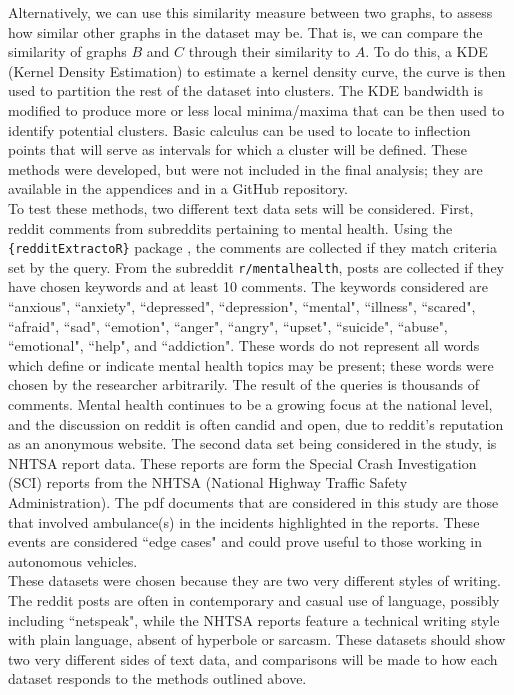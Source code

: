 Alternatively, we can use this similarity measure between two graphs, to assess how similar other graphs in the dataset may be. That is, we can compare the similarity of graphs $B$ and $C$ through their similarity to $A$. To do this, a KDE (Kernel Density Estimation) to estimate a kernel density curve, the curve is then used to partition the rest of the dataset into clusters. The KDE bandwidth is modified to produce more or less local minima/maxima that can be then used to identify potential clusters. Basic calculus can be used to locate to inflection points that will serve as intervals for which a cluster will be defined. These methods were developed, but were not included in the final analysis; they are available in the appendices and in a GitHub repository. \\

To test these methods, two different text data sets will be considered. First, reddit comments from subreddits pertaining to mental health. Using the \texttt{\{redditExtractoR\}} package \cite{rivera2015package}, the comments are collected if they match criteria set by the query. From the subreddit \texttt{r/mentalhealth}, posts are collected if they have chosen keywords and at least 10 comments. The keywords considered are ``anxious", ``anxiety", ``depressed", ``depression", ``mental", ``illness", ``scared", ``afraid", ``sad", ``emotion", ``anger", ``angry", ``upset", ``suicide", ``abuse", ``emotional", ``help", and ``addiction". These words do not represent all words which define or indicate mental health topics may be present; these words were chosen by the researcher arbitrarily. The result of the queries is thousands of comments. Mental health continues to be a growing focus at the national level, and the discussion on reddit is often candid and open, due to reddit's reputation as an anonymous website. The second data set being considered in the study, is NHTSA report data. These reports are form the Special Crash Investigation (SCI) reports from the NHTSA (National Highway Traffic Safety Administration). The pdf documents that are considered in this study are those that involved ambulance(s) in the incidents highlighted in the reports. These events are considered ``edge cases" and could prove useful to those working in autonomous vehicles. \\

These datasets were chosen because they are two very different styles of writing. The reddit posts are often in contemporary and casual use of language, possibly including ``netspeak", while the NHTSA reports feature a technical writing style with plain language, absent of hyperbole or sarcasm. These datasets should show two very different sides of text data, and comparisons will be made to how each dataset responds to the methods outlined above. \\

